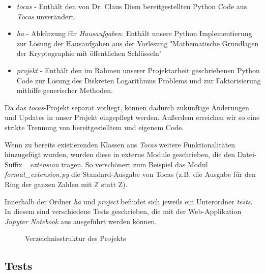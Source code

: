 \documentclass{scrartcl}
\begin{document}
\begin{itemize}
\item \emph{tocas} - Enthält den von Dr. Claus Diem bereitgestellten Python Code aus \emph{Tocas} \cite{tocas} unverändert.

\item \emph{ha} - Abkürzung für \emph{Hausaufgaben}. Enthält unsere Python Implementierung zur Lösung der Hausaufgaben aus der Vorlesung "Mathematische Grundlagen der Kryptographie mit öffentlichen Schlüsseln"
\item \emph{projekt} - Enthält den im Rahmen unserer Projektarbeit geschriebenen Python Code zur Lösung des Diskreten Logarithmus Problems und zur Faktorisierung mithilfe generischer Methoden.
\end{itemize}
Da das \emph{tocas}-Projekt separat vorliegt, können dadurch zukünftige Änderungen und Updates in unser Projekt eingepflegt werden. Außerdem erreichen wir so eine strikte Trennung von bereitgestelltem und eigenem Code.

Wenn zu bereits existierenden Klassen aus \emph{Tocas} weitere Funktionalitäten hinzugefügt wurden, wurden diese in externe Module geschrieben, die den Datei-Suffix \emph{\_extension} tragen. So verschönert zum Beispiel das Modul \emph{format\_extension.py} die Standard-Ausgabe von Tocas (z.B. die Ausgabe für den Ring der ganzen Zahlen mit \( \mathbb{Z} \) statt Z).

Innerhalb der Ordner \emph{ha} und \emph{project} befindet sich jeweils ein Unterordner \emph{tests}. In diesem sind verschiedene Tests geschrieben, die mit der Web-Applikation \emph{Jupyter Notebook} aus \cite{jupyterNotebook} ausgeführt werden können.

\begin{figure}[h]
  \caption{Verzeichnisstruktur des Projekts}
  \label{fig:verzeichnisstruktur}
\end{figure}

\subsection{Tests}
\label{sec:tests}
\end{document}
